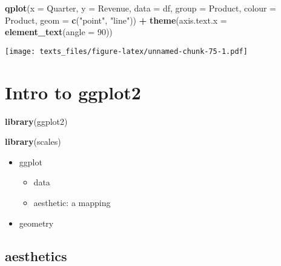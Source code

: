 \documentclass[]{book}
\newenvironment{Shaded}{\begin{snugshade}}{\end{snugshade}}
\newcommand{\DataTypeTok}[1]{\textcolor[rgb]{0.13,0.29,0.53}{#1}}
\newcommand{\DecValTok}[1]{\textcolor[rgb]{0.00,0.00,0.81}{#1}}
\newcommand{\KeywordTok}[1]{\textcolor[rgb]{0.13,0.29,0.53}{\textbf{#1}}}
\newcommand{\NormalTok}[1]{#1}
\newcommand{\OperatorTok}[1]{\textcolor[rgb]{0.81,0.36,0.00}{\textbf{#1}}}
\newcommand{\StringTok}[1]{\textcolor[rgb]{0.31,0.60,0.02}{#1}}
\providecommand{\tightlist}{%
  \setlength{\itemsep}{0pt}\setlength{\parskip}{0pt}}
\begin{document}
\begin{Shaded}
\begin{Highlighting}[]
\KeywordTok{qplot}\NormalTok{(}\DataTypeTok{x =}\NormalTok{ Quarter, }\DataTypeTok{y =}\NormalTok{ Revenue, }\DataTypeTok{data =}\NormalTok{ df, }\DataTypeTok{group =}\NormalTok{ Product, }\DataTypeTok{colour =}\NormalTok{ Product, }\DataTypeTok{geom =} \KeywordTok{c}\NormalTok{(}\StringTok{"point"}\NormalTok{, }\StringTok{"line"}\NormalTok{)) }\OperatorTok{+}\StringTok{ }\KeywordTok{theme}\NormalTok{(}\DataTypeTok{axis.text.x =} \KeywordTok{element_text}\NormalTok{(}\DataTypeTok{angle =} \DecValTok{90}\NormalTok{))}
\end{Highlighting}
\end{Shaded}

\texttt{[image: texts\_files/figure-latex/unnamed-chunk-75-1.pdf]}

\hypertarget{intro-to-ggplot2}{%
\chapter{Intro to ggplot2}\label{intro-to-ggplot2}}

\begin{Shaded}
\begin{Highlighting}[]
\KeywordTok{library}\NormalTok{(ggplot2)}
\end{Highlighting}
\end{Shaded}

\begin{Shaded}
\begin{Highlighting}[]
\KeywordTok{library}\NormalTok{(scales)}
\end{Highlighting}
\end{Shaded}

\begin{itemize}
\tightlist
\item
  ggplot

  \begin{itemize}
  \tightlist
  \item
    data
  \item
    aesthetic: a mapping
  \end{itemize}
\item
  geometry
\end{itemize}

\hypertarget{ggaes}{%
\section*{aesthetics}\label{ggaes}}
\end{document}
